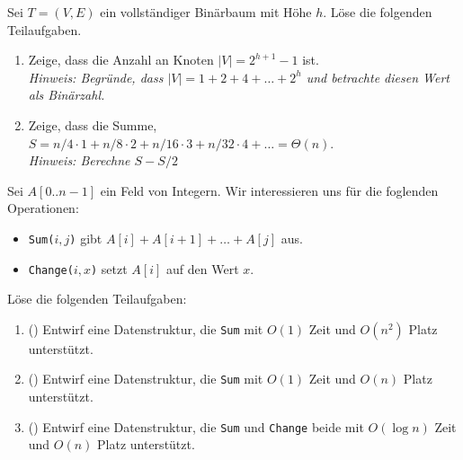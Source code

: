 \documentclass{uebung_cs}
\begin{document}
\begin{aufgabe}
	Sei $T = (V,E)$ ein vollständiger Binärbaum mit Höhe $h$.
	Löse die folgenden Teilaufgaben.
	\begin{enumerate}
		\item Zeige, dass die Anzahl an Knoten $|V| = 2^{h+1} - 1$ ist.\\
		\textit{Hinweis: Begründe, dass $|V| = 1 + 2 + 4 + \hdots + 2^h$ und betrachte diesen Wert als Binärzahl.}
		\item Zeige, dass die Summe, $S = n / 4 \cdot 1 + n / 8 \cdot 2 + n / 16 \cdot 3 + n / 32 \cdot 4 + \hdots = \Theta(n)$.\\
		\textit{Hinweis: Berechne $S - S/2$}
	\end{enumerate}
\end{aufgabe}


\begin{aufgabe}[Summen]
	Sei $A[0..n-1]$ ein Feld von Integern.
	Wir interessieren uns für die foglenden Operationen:
	\begin{itemize}
		\item \texttt{Sum($i,j$)} gibt $A[i] + A[i+1] + \hdots + A[j]$ aus.
		\item \texttt{Change($i,x$)} setzt $A[i]$ auf den Wert $x$.
	\end{itemize}
	Löse die folgenden Teilaufgaben:
	\begin{enumerate}
		\item (\warmup) Entwirf eine Datenstruktur, die \texttt{Sum} mit $O(1)$ Zeit und $O(n^2)$ Platz unterstützt.
		\item (\hard) Entwirf eine Datenstruktur, die \texttt{Sum} mit $O(1)$ Zeit und $O(n)$ Platz unterstützt.
		\item (\veryhard) Entwirf eine Datenstruktur, die \texttt{Sum} und \texttt{Change} beide mit $O(\log n)$ Zeit und $O(n)$ Platz unterstützt.
	\end{enumerate}
\end{aufgabe}
\end{document}
